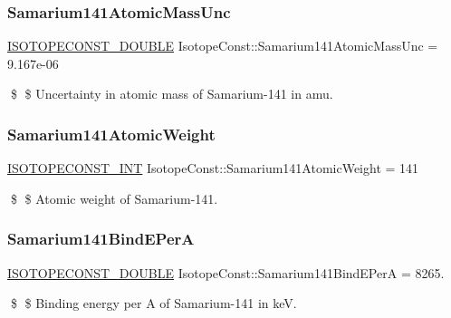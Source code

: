 \subsubsection{\texorpdfstring{Samarium141\+Atomic\+Mass\+Unc}{Samarium141AtomicMassUnc}}
{\footnotesize\ttfamily \mbox{\hyperlink{group___isotope_const-_macros_ga8f45a7272ce02c0b4c65c44636ed719a}{I\+S\+O\+T\+O\+P\+E\+C\+O\+N\+S\+T\+\_\+\+D\+O\+U\+B\+LE}} Isotope\+Const\+::\+Samarium141\+Atomic\+Mass\+Unc = 9.\+167e-\/06}

\$ \$ Uncertainty in atomic mass of Samarium-\/141 in amu. \mbox{\label{group___isotope_const-_samarium-_sm141_ga4dee0511b092ad6850c9b7d1a7ce6c65}} 
\subsubsection{\texorpdfstring{Samarium141\+Atomic\+Weight}{Samarium141AtomicWeight}}
{\footnotesize\ttfamily \mbox{\hyperlink{group___isotope_const-_macros_ga5f18360b3e99483a35c32d789e62621c}{I\+S\+O\+T\+O\+P\+E\+C\+O\+N\+S\+T\+\_\+\+I\+NT}} Isotope\+Const\+::\+Samarium141\+Atomic\+Weight = 141}

\$ \$ Atomic weight of Samarium-\/141. \mbox{\label{group___isotope_const-_samarium-_sm141_gac9e301b837a88f5909bff1f9cb123684}} 
\subsubsection{\texorpdfstring{Samarium141\+Bind\+E\+PerA}{Samarium141BindEPerA}}
{\footnotesize\ttfamily \mbox{\hyperlink{group___isotope_const-_macros_ga8f45a7272ce02c0b4c65c44636ed719a}{I\+S\+O\+T\+O\+P\+E\+C\+O\+N\+S\+T\+\_\+\+D\+O\+U\+B\+LE}} Isotope\+Const\+::\+Samarium141\+Bind\+E\+PerA = 8265.}

\$ \$ Binding energy per A of Samarium-\/141 in keV. \mbox{\label{group___isotope_const-_samarium-_sm141_gad2759ae319a8d1f43146fe86b52e208a}} 
